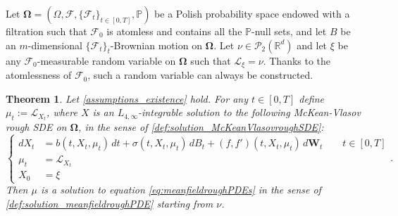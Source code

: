 \documentclass[10pt, a4paper]{article} %
\newcommand{\R}{\mathbb{R}}
\theoremstyle{definition}
\theoremstyle{plain}
\newtheorem{thm}[defn]{Theorem}
\begin{document}
Let $\mathbf{\Omega}=(\Omega,\mathcal{F},\{\mathcal{F}_t\}_{t \in [0,T]},\mathbb{P})$ be a 
Polish probability space endowed with a filtration such that $\mathcal{F}_0$ {is atomless and} contains all the $\mathbb{P}$-null sets, and let $B$ be an $m$-dimensional $\{\mathcal{F}_t\}_t$-Brownian motion on $\mathbf{\Omega}$. 
Let $\nu \in \mathcal{P}_2(\R^d)$ and let $\xi$ be any $\mathcal{F}_0$-measurable random variable on $\mathbf{\Omega}$ such that $\mathcal{L}_\xi = \nu$. {Thanks to the atomlessness of $\mathcal{F}_0$, such a random variable can always be constructed.}

\begin{thm} \label{thm:existence_meanfieldroughPDE}
   Let \cref{assumptions_existence} hold.
   For any $t \in [0,T]$ define $\mu_t := \mathcal{L}_{X_t}$, where $X$ is an $L_{4,\infty}$-integrable solution to the following McKean-Vlasov rough SDE on $\mathbf{\Omega}$, in the sense of \cref{def:solution_McKeanVlasovroughSDE}:
   \begin{equation} \label{eq:McKean-VlasovroughSDE_existence}
        \begin{cases}
            dX_t &= b(t, X_t,\mu_t) \, dt + \sigma(t, X_t,\mu_t) \, dB_t + (f,f')(t, X_t,\mu_t) \, d\mathbf{W}_t \qquad t \in [0,T] \\
            \mu_t &= \mathcal{L}_{X_t} \\
            X_0 &= \xi 
        \end{cases} .
    \end{equation}  
   Then $\mu$ is a solution to equation \eqref{eq:meanfieldroughPDEs} in the sense of \cref{def:solution_meanfieldroughPDE} starting from $\nu$.  
\end{thm}
\end{document}
